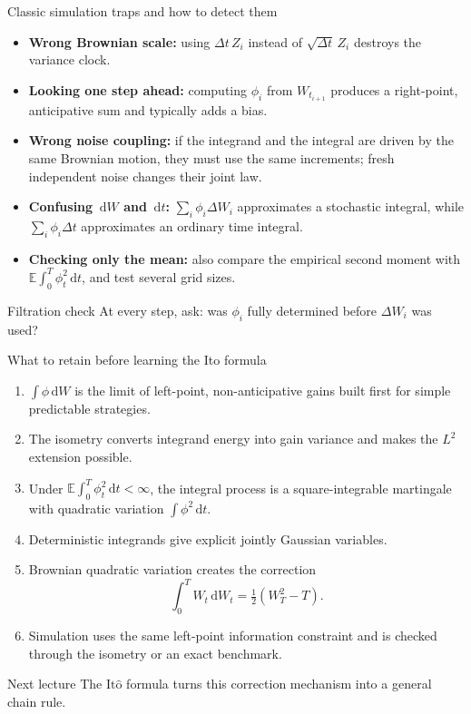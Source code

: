 \documentclass[10pt,aspectratio=169]{beamer}
\newcommand{\E}{\mathbb E}
\newcommand{\dd}{\,\mathrm d}
\newcommand{\Ito}{\mathrm{It\hat{o}}}
\begin{document}
\begin{frame}{Classic simulation traps and how to detect them}
\footnotesize
\begin{itemize}\setlength{\itemsep}{0.3em}
  \item \textbf{Wrong Brownian scale:} using \(\Delta t\,Z_i\) instead of \(\sqrt{\Delta t}\,Z_i\) destroys the variance clock.
  \item \textbf{Looking one step ahead:} computing \(\phi_i\) from \(W_{t_{i+1}}\) produces a right-point, anticipative sum and typically adds a bias.
  \item \textbf{Wrong noise coupling:} if the integrand and the integral are driven by the same Brownian motion, they must use the same increments; fresh independent noise changes their joint law.
  \item \textbf{Confusing \(\dd W\) and \(\dd t\):} \(\sum_i\phi_i\Delta W_i\) approximates a stochastic integral, while \(\sum_i\phi_i\Delta t\) approximates an ordinary time integral.
  \item \textbf{Checking only the mean:} also compare the empirical second moment with \(\E\int_0^T\phi_t^2\dd t\), and test several grid sizes.
\end{itemize}
\begin{alertblock}{Filtration check}
At every step, ask: was \(\phi_i\) fully determined before \(\Delta W_i\) was used?
\end{alertblock}
\end{frame}

\begin{frame}{What to retain before learning the Ito formula}
\small
\begin{enumerate}\setlength{\itemsep}{0.25em}
  \item \(\int\phi\dd W\) is the limit of left-point, non-anticipative gains built first for simple predictable strategies.
  \item The isometry converts integrand energy into gain variance and makes the \(L^2\) extension possible.
  \item Under \(\E\int_0^T\phi_t^2\dd t<\infty\), the integral process is a square-integrable martingale with quadratic variation \(\int\phi^2\dd t\).
  \item Deterministic integrands give explicit jointly Gaussian variables.
  \item Brownian quadratic variation creates the correction
  \[
  \int_0^T W_t\dd W_t=\tfrac12(W_T^2-T).
  \]
  \item Simulation uses the same left-point information constraint and is checked through the isometry or an exact benchmark.
\end{enumerate}
\begin{block}{Next lecture}
The \(\Ito\) formula turns this correction mechanism into a general chain rule.
\end{block}
\end{frame}
\end{document}
